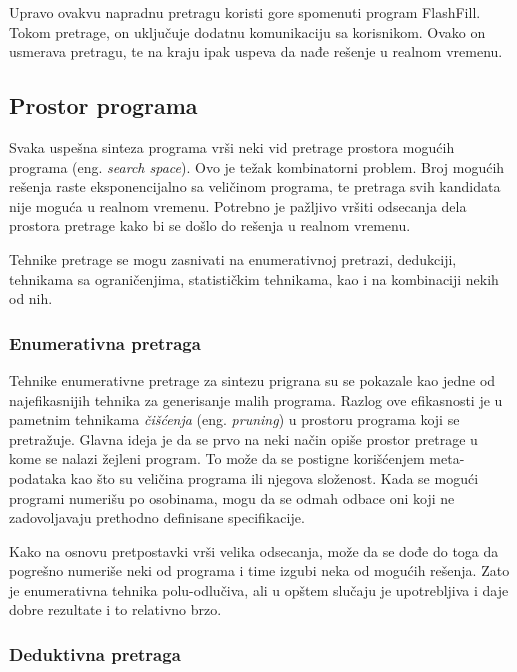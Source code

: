 Upravo ovakvu napradnu pretragu koristi gore spomenuti program FlashFill. Tokom pretrage, on uključuje dodatnu komunikaciju sa korisnikom. Ovako on usmerava pretragu, te na kraju ipak uspeva da nađe rešenje u realnom vremenu.


\subsection{Prostor programa}
\label{subsec:ProstorPrograma}

Svaka uspešna sinteza programa vrši neki vid pretrage prostora mogućih programa (eng. \emph{search space}). Ovo je težak kombinatorni problem. Broj mogućih rešenja raste eksponencijalno sa veličinom programa, te pretraga svih kandidata nije moguća u realnom vremenu. Potrebno je pažljivo vršiti odsecanja dela prostora pretrage kako bi se došlo do rešenja u realnom vremenu.

Tehnike pretrage se mogu zasnivati na enumerativnoj pretrazi, dedukciji, tehnikama sa ograničenjima, statističkim tehnikama, kao i na kombinaciji nekih od nih.


\subsubsection{Enumerativna pretraga}
\label{subsubsec:Enumerative}

Tehnike enumerativne pretrage za sintezu prigrana su se pokazale kao jedne od najefikasnijih tehnika za generisanje malih programa. Razlog ove efikasnosti je u pametnim tehnikama \emph{čišćenja} (eng. \emph{pruning}) u prostoru programa koji se pretražuje. Glavna ideja je da se prvo na neki način opiše prostor pretrage u kome se nalazi žejleni program. To može da se postigne korišćenjem meta-podataka kao što su veličina programa ili njegova složenost. Kada se mogući programi numerišu po osobinama, mogu da se odmah odbace oni koji ne zadovoljavaju prethodno definisane specifikacije.

Kako na osnovu pretpostavki vrši velika odsecanja, može da se dođe do toga da pogrešno numeriše neki od programa i time izgubi neka od mogućih rešenja. Zato je enumerativna tehnika polu-odlučiva, ali u opštem slučaju je upotrebljiva i daje dobre rezultate i to relativno brzo.



\subsubsection{Deduktivna pretraga}
\label{subsubsec:Deductive}

